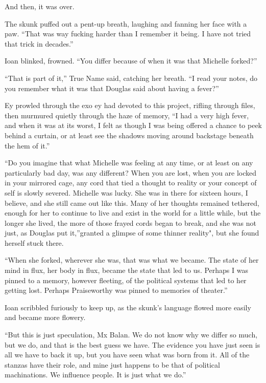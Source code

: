 And then, it was over.

The skunk puffed out a pent-up breath, laughing and fanning her face with a paw. ``That was way fucking harder than I remember it being. I have not tried that trick in decades.''

Ioan blinked, frowned. ``You differ because of when it was that Michelle forked?''

``That is part of it,'' True Name said, catching her breath. ``I read your notes, do you remember what it was that Douglas said about having a fever?''

Ey prowled through the exo ey had devoted to this project, rifling through files, then murmured quietly through the haze of memory, ``I had a very high fever, and when it was at its worst, I felt as though I was being offered a chance to peek behind a curtain, or at least see the shadows moving around backstage beneath the hem of it.''

``Do you imagine that what Michelle was feeling at any time, or at least on any particularly bad day, was any different? When you are lost, when you are locked in your mirrored cage, any cord that tied a thought to reality or your concept of self is slowly severed. Michelle was lucky. She was in there for sixteen hours, I believe, and she still came out like this. Many of her thoughts remained tethered, enough for her to continue to live and exist in the world for a little while, but the longer she lived, the more of those frayed cords began to break, and she was not just, as Douglas put it,''granted a glimpse of some thinner reality", but she found herself stuck there.

``When she forked, wherever she was, that was what we became. The state of her mind in flux, her body in flux, became the state that led to us. Perhaps I was pinned to a memory, however fleeting, of the political systems that led to her getting lost. Perhaps Praiseworthy was pinned to memories of theater.''

Ioan scribbled furiously to keep up, as the skunk's language flowed more easily and became more flowery.

``But this is just speculation, Mx Balan. We do not know why we differ so much, but we do, and that is the best guess we have. The evidence you have just seen is all we have to back it up, but you have seen what was born from it. All of the stanzas have their role, and mine just happens to be that of political machinations. We influence people. It is just what we do.''

